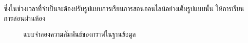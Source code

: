 \documentclass[conference]{IEEEtran}
\begin{document}
    ซึ่งในช่วงเวลาที่จำเป็นจะต้องปรับรูปแบบการเรียนการสอนออนไลน์อย่างเต็มรูปแบบนั้น 
    ให้การเรียนการสอนผ่านห้อง

    \begin{figure}[htbp]
        \caption{แบบจำลองความสัมพันธ์ของกราฟในฐานข้อมูล}
        \label{fig:graph-modeling}
    \end{figure}

    
    
\end{document}

